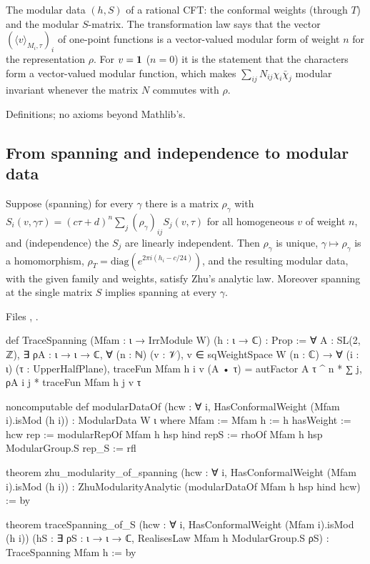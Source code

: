 \begin{physics}
The modular data $(h,S)$ of a rational CFT: the conformal weights (through $T$) and the modular $S$-matrix. The
transformation law says that the vector $(\langle v\rangle_{M_i,\tau})_i$ of one-point functions is a vector-valued modular
form of weight $n$ for the representation $\rho$. For $v=\mathbf{1}$ ($n=0$) it is the statement that the characters form a
vector-valued modular function, which makes $\sum_{ij}N_{ij}\chi_i\bar\chi_j$ modular invariant whenever the matrix $N$
commutes with $\rho$.
\end{physics}

\begin{status}
Definitions; no axioms beyond Mathlib's.
\end{status}

\subsection{From spanning and independence to modular data}

\begin{theorem}\label{l15:thm:spanning}
Suppose (spanning) for every $\gamma$ there is a matrix $\rho_\gamma$ with $S_i(v,\gamma\tau)=(c\tau+d)^n\sum_j(\rho_\gamma)_{ij}S_j(v,\tau)$
for all homogeneous $v$ of weight $n$, and (independence) the $S_j$ are linearly independent. Then $\rho_\gamma$ is unique,
$\gamma\mapsto\rho_\gamma$ is a homomorphism, $\rho_T=\mathrm{diag}(e^{2\pi i(h_i-c/24)})$, and the resulting modular data, with
the given family and weights, satisfy Zhu's analytic law. Moreover spanning at the single matrix $S$ implies spanning
at every $\gamma$.
\end{theorem}
\noindent Files ,
.
\begin{leancode}
def TraceSpanning (Mfam : ι → IrrModule W) (h : ι → ℂ) : Prop :=
  ∀ A : SL(2, ℤ), ∃ ρA : ι → ι → ℂ, ∀ (n : ℕ) (v : 𝒱), v ∈ sqWeightSpace W (n : ℂ) →
    ∀ (i : ι) (τ : UpperHalfPlane),
      traceFun Mfam h i v (A • τ) = autFactor A τ ^ n * ∑ j, ρA i j * traceFun Mfam h j v τ

noncomputable def modularDataOf (hcw : ∀ i, HasConformalWeight (Mfam i).isMod (h i)) :
    ModularData W ι where
  Mfam := Mfam
  h := h
  hasWeight := hcw
  rep := modularRepOf Mfam h hsp hind
  repS := rhoOf Mfam h hsp ModularGroup.S
  rep_S := rfl

theorem zhu_modularity_of_spanning (hcw : ∀ i, HasConformalWeight (Mfam i).isMod (h i)) :
    ZhuModularityAnalytic (modularDataOf Mfam h hsp hind hcw) := by

theorem traceSpanning_of_S (hcw : ∀ i, HasConformalWeight (Mfam i).isMod (h i))
    (hS : ∃ ρS : ι → ι → ℂ, RealisesLaw Mfam h ModularGroup.S ρS) :
    TraceSpanning Mfam h := by
\end{leancode}


